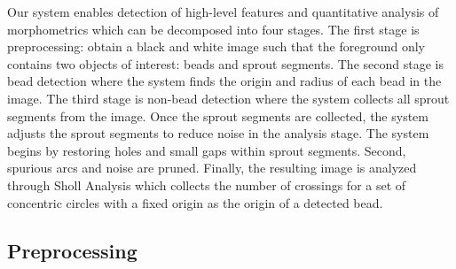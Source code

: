 \documentclass{sig-alternate}
\begin{document}



	Our system enables detection of high-level features and quantitative
	analysis of morphometrics which can be decomposed into four stages.
	The first stage is preprocessing: obtain a black and white image such
	that the foreground only contains two objects of interest: beads and
	sprout segments. The second stage is bead detection where the system
	finds the origin and radius of each bead in the image.  The third
	stage is non-bead detection where the system collects all sprout
	segments from the image. Once the sprout segments are collected, the
	system adjusts the sprout segments to reduce noise in the analysis
	stage. The system begins by restoring holes and small gaps within
	sprout segments. Second, spurious arcs and noise are pruned. Finally,
	the resulting image is analyzed through Sholl Analysis which collects
	the number of crossings for a set of concentric circles with a fixed
	origin as the origin of a detected bead.


	\subsection{Preprocessing} %
	\label{sub:Preprocessing}
\end{document}
